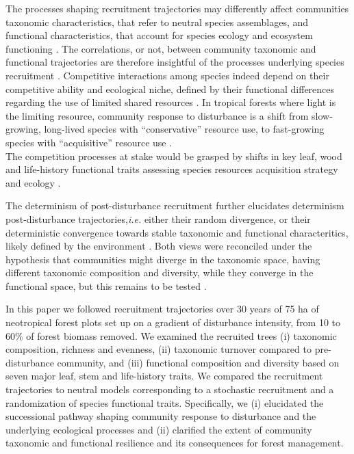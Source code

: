 \documentclass[fleqn,10pt]{ArtEcoFoG} %
\begin{document}
The processes shaping recruitment trajectories may differently affect
communities taxonomic characteristics, that refer to neutral species
assemblages, and functional characteristics, that account for species
ecology and ecosystem functioning \citep{Violle2007b, Kunstler2016}. The
correlations, or not, between community taxonomic and functional
trajectories are therefore insightful of the processes underlying
species recruitment \citep{Mayfield2010, Villeger2012, Fukami2005}.
Competitive interactions among species indeed depend on their
competitive ability and ecological niche, defined by their functional
differences regarding the use of limited shared resources
\citep{Webb2002, Perronne2017}. In tropical forests where light is the
limiting resource, community response to disturbance is a shift from
slow-growing, long-lived species with ``conservative'' resource use, to
fast-growing species with ``acquisitive'' resource use
\citep{Denslow1980, Molino2001, Bongers2009}.\\
The competition processes at stake would be grasped by shifts in key
leaf, wood and life-history functional traits assessing species
resources acquisition strategy and ecology
\citep{Wright2004, Chave2009b, Herault2011, Gerhold2015}.

The determinism of post-disturbance recruitment further elucidates
determinism post-disturbance trajectories,\emph{i.e.} either their
random divergence, or their deterministic convergence towards stable
taxonomic and functional characteritics, likely defined by the
environment \citep{Clements1916, Diamond1975}. Both views were
reconciled under the hypothesis that communities might diverge in the
taxonomic space, having different taxonomic composition and diversity,
while they converge in the functional space, but this remains to be
tested \citep{Fukami2005, Li2018}.

In this paper we followed recruitment trajectories over 30 years of 75
ha of neotropical forest plots set up on a gradient of disturbance
intensity, from 10 to 60\% of forest biomass removed. We examined the
recruited trees (i) taxonomic composition, richness and evenness, (ii)
taxonomic turnover compared to pre-disturbance community, and (iii)
functional composition and diversity based on seven major leaf, stem and
life-history traits. We compared the recruitment trajectories to neutral
models corresponding to a stochastic recruitment and a randomization of
species functional traits. Specifically, we (i) elucidated the
successional pathway shaping community response to disturbance and the
underlying ecological processes and (ii) clarified the extent of
community taxonomic and functional resilience and its consequences for
forest management.
\end{document}
